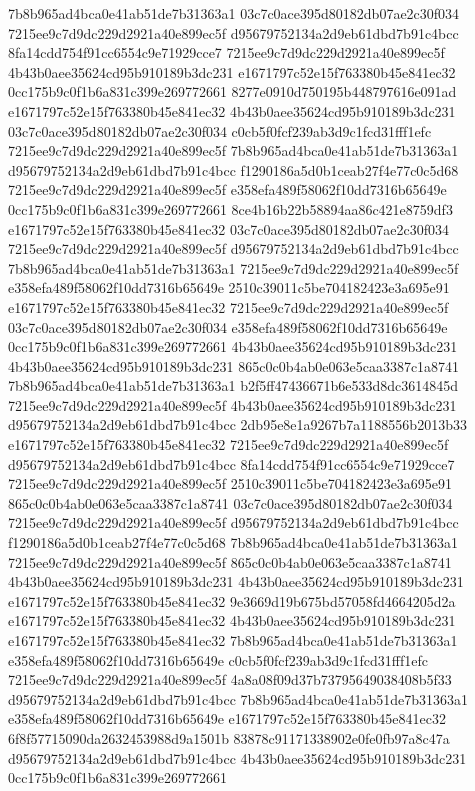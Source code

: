 7b8b965ad4bca0e41ab51de7b31363a1
03c7c0ace395d80182db07ae2c30f034
7215ee9c7d9dc229d2921a40e899ec5f
d95679752134a2d9eb61dbd7b91c4bcc
8fa14cdd754f91cc6554c9e71929cce7
7215ee9c7d9dc229d2921a40e899ec5f
4b43b0aee35624cd95b910189b3dc231
e1671797c52e15f763380b45e841ec32
0cc175b9c0f1b6a831c399e269772661
8277e0910d750195b448797616e091ad
e1671797c52e15f763380b45e841ec32
4b43b0aee35624cd95b910189b3dc231
03c7c0ace395d80182db07ae2c30f034
c0cb5f0fcf239ab3d9c1fcd31fff1efc
7215ee9c7d9dc229d2921a40e899ec5f
7b8b965ad4bca0e41ab51de7b31363a1
d95679752134a2d9eb61dbd7b91c4bcc
f1290186a5d0b1ceab27f4e77c0c5d68
7215ee9c7d9dc229d2921a40e899ec5f
e358efa489f58062f10dd7316b65649e
0cc175b9c0f1b6a831c399e269772661
8ce4b16b22b58894aa86c421e8759df3
e1671797c52e15f763380b45e841ec32
03c7c0ace395d80182db07ae2c30f034
7215ee9c7d9dc229d2921a40e899ec5f
d95679752134a2d9eb61dbd7b91c4bcc
7b8b965ad4bca0e41ab51de7b31363a1
7215ee9c7d9dc229d2921a40e899ec5f
e358efa489f58062f10dd7316b65649e
2510c39011c5be704182423e3a695e91
e1671797c52e15f763380b45e841ec32
7215ee9c7d9dc229d2921a40e899ec5f
03c7c0ace395d80182db07ae2c30f034
e358efa489f58062f10dd7316b65649e
0cc175b9c0f1b6a831c399e269772661
4b43b0aee35624cd95b910189b3dc231
4b43b0aee35624cd95b910189b3dc231
865c0c0b4ab0e063e5caa3387c1a8741
7b8b965ad4bca0e41ab51de7b31363a1
b2f5ff47436671b6e533d8dc3614845d
7215ee9c7d9dc229d2921a40e899ec5f
4b43b0aee35624cd95b910189b3dc231
d95679752134a2d9eb61dbd7b91c4bcc
2db95e8e1a9267b7a1188556b2013b33
e1671797c52e15f763380b45e841ec32
7215ee9c7d9dc229d2921a40e899ec5f
d95679752134a2d9eb61dbd7b91c4bcc
8fa14cdd754f91cc6554c9e71929cce7
7215ee9c7d9dc229d2921a40e899ec5f
2510c39011c5be704182423e3a695e91
865c0c0b4ab0e063e5caa3387c1a8741
03c7c0ace395d80182db07ae2c30f034
7215ee9c7d9dc229d2921a40e899ec5f
d95679752134a2d9eb61dbd7b91c4bcc
f1290186a5d0b1ceab27f4e77c0c5d68
7b8b965ad4bca0e41ab51de7b31363a1
7215ee9c7d9dc229d2921a40e899ec5f
865c0c0b4ab0e063e5caa3387c1a8741
4b43b0aee35624cd95b910189b3dc231
4b43b0aee35624cd95b910189b3dc231
e1671797c52e15f763380b45e841ec32
9e3669d19b675bd57058fd4664205d2a
e1671797c52e15f763380b45e841ec32
4b43b0aee35624cd95b910189b3dc231
e1671797c52e15f763380b45e841ec32
7b8b965ad4bca0e41ab51de7b31363a1
e358efa489f58062f10dd7316b65649e
c0cb5f0fcf239ab3d9c1fcd31fff1efc
7215ee9c7d9dc229d2921a40e899ec5f
4a8a08f09d37b73795649038408b5f33
d95679752134a2d9eb61dbd7b91c4bcc
7b8b965ad4bca0e41ab51de7b31363a1
e358efa489f58062f10dd7316b65649e
e1671797c52e15f763380b45e841ec32
6f8f57715090da2632453988d9a1501b
83878c91171338902e0fe0fb97a8c47a
d95679752134a2d9eb61dbd7b91c4bcc
4b43b0aee35624cd95b910189b3dc231
0cc175b9c0f1b6a831c399e269772661
